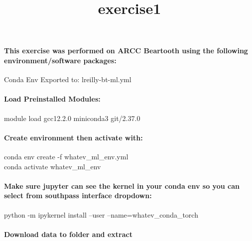 \documentclass[11pt]{article}
\title{exercise1}
\begin{document}
    
    \maketitle
    
    

    
    \hypertarget{this-exercise-was-performed-on-arcc-beartooth-using-the-following-environmentsoftware-packages}{%
\paragraph{This exercise was performed on ARCC Beartooth\cite{beartooth} using the
following environment/software
packages:}\label{this-exercise-was-performed-on-arcc-beartooth-using-the-following-environmentsoftware-packages}}

Conda Env Exported to: lreilly-bt-ml.yml

\hypertarget{load-preinstalled-modules}{%
\paragraph{Load Preinstalled Modules:}\label{load-preinstalled-modules}}

module load gcc12.2.0 miniconda3 git/2.37.0

\hypertarget{create-environment-then-activate-with}{%
\paragraph{Create environment then activate
with:}\label{create-environment-then-activate-with}}

conda env create -f whatev\_ml\_env.yml\\
conda activate whatev\_ml\_env

\hypertarget{make-sure-jupyter-can-see-the-kernel-in-your-conda-env-so-you-can-select-from-southpass-interface-dropdown}{%
\paragraph{Make sure jupyter can see the kernel in your conda env so you
can select from southpass interface
dropdown:}\label{make-sure-jupyter-can-see-the-kernel-in-your-conda-env-so-you-can-select-from-southpass-interface-dropdown}}

python -m ipykernel install --user --name=whatev\_conda\_torch

\hypertarget{download-data-to-folder-and-extract}{%
\paragraph{Download data to folder and
extract}\label{download-data-to-folder-and-extract}}
\end{document}
